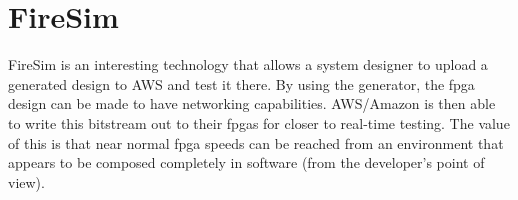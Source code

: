 \section{FireSim}\label{sec:FireSim_Simulator}
\nocite{firesimPresentation}
FireSim is an interesting technology that allows a system designer to upload a generated design to AWS and test it there.
By using the  generator, the \gls{fpga} design can be made to have networking capabilities.
AWS/Amazon is then able to write this bitstream out to their \glspl{fpga} for closer to real-time testing.
The value of this is that near normal \gls{fpga} speeds can be reached from an environment that appears to be composed completely in software (from the developer's point of view).

